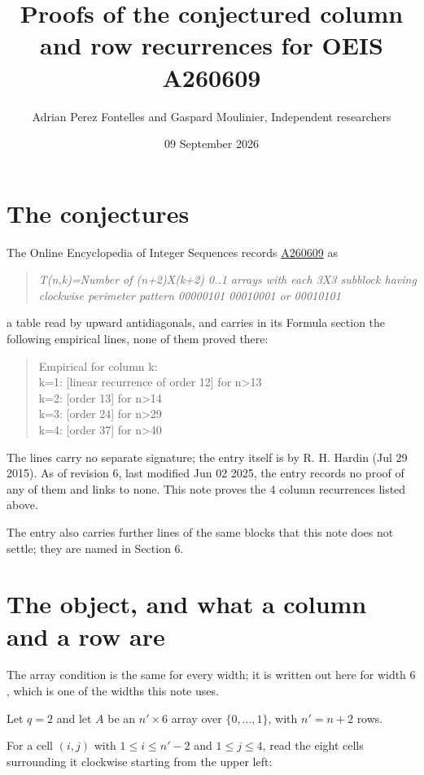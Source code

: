 \documentclass[11pt]{article}
\title{Proofs of the conjectured column and row recurrences for OEIS A260609}
\author{Adrian Perez Fontelles and Gaspard Moulinier, Independent researchers}
\date{09 September 2026}
\theoremstyle{definition}
\begin{document}
\maketitle
\section{The conjectures}

The Online Encyclopedia of Integer Sequences records \href{https://oeis.org/A260609}{A260609} as

\begin{quote}\itshape T(n,k)=Number of (n+2)X(k+2) 0..1 arrays with each 3X3 subblock having clockwise perimeter pattern 00000101 00010001 or 00010101\end{quote}

a table read by upward antidiagonals, and carries in its Formula section the following empirical lines, none of them proved there:

\begin{quote}\ttfamily Empirical for column k:\\
k=1: [linear recurrence of order 12] for n>13\\k=2: [order 13] for n>14\\k=3: [order 24] for n>29\\k=4: [order 37] for n>40\end{quote}

The lines carry no separate signature; the entry itself is by R. H. Hardin (Jul 29 2015). As of revision 6, last modified Jun 02 2025, the entry records no proof of any of them and links to none. This note proves the 4 column recurrences listed above.

The entry also carries further lines of the same blocks that this note does not settle; they are named in Section 6.

\section{The object, and what a column and a row are}

The array condition is the same for every width; it is written out here for width $6$, which is one of the widths this note uses.

Let $q = 2$ and let $A$ be an $n' \times 6$ array over $\{0,\dots,1\}$, with $n' = n + 2$ rows.

For a cell $(i,j)$ with $1 \le i \le n'-2$ and $1 \le j \le 4$, read the eight cells surrounding it clockwise starting from the upper left:
\end{document}
